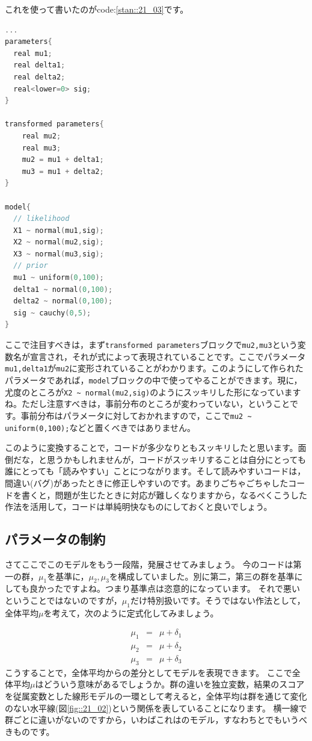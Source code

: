 \documentclass{ltjsbook}
\begin{document}
これを使って書いたのがcode:\ref{stan::21_03}です。
\begin{lstlisting}[language=C++,label={stan::21_03},caption={パラメータ変換を入れたコード}]
...
parameters{
  real mu1;
  real delta1;
  real delta2;
  real<lower=0> sig;
}

transformed parameters{
    real mu2;
    real mu3;
    mu2 = mu1 + delta1;
    mu3 = mu1 + delta2;
}

model{
  // likelihood
  X1 ~ normal(mu1,sig);
  X2 ~ normal(mu2,sig);
  X3 ~ normal(mu3,sig);
  // prior
  mu1 ~ uniform(0,100);
  delta1 ~ normal(0,100);
  delta2 ~ normal(0,100);
  sig ~ cauchy(0,5);
}

\end{lstlisting}
ここで注目すべきは，まず\verb|transformed parameters|ブロックで\verb|mu2,mu3|という変数名が宣言され，それが式によって表現されていることです。ここでパラメータ\verb|mu1,delta1|が\verb|mu2|に変形されていることがわかります。このようにして作られたパラメータであれば，\verb|model|ブロックの中で使ってやることができます。現に，尤度のところが\verb|X2 ~ normal(mu2,sig)|のようにスッキリした形になっていますね。ただし注意すべきは，事前分布のところが変わっていない，ということです。事前分布はパラメータに対しておかれますので，ここで\verb|mu2 ~ uniform(0,100);|などと置くべきではありません。

このように変換することで，コードが多少なりともスッキリしたと思います。面倒だな，と思うかもしれませんが，コードがスッキリすることは自分にとっても誰にとっても「読みやすい」ことにつながります。そして読みやすいコードは，間違い(バグ)があったときに修正しやすいのです。あまりごちゃごちゃしたコードを書くと，問題が生じたときに対応が難しくなりますから，なるべくこうした作法を活用して，コードは単純明快なものにしておくと良いでしょう。
\subsection{パラメータの制約}
さてここでこのモデルをもう一段階，発展させてみましょう。
今のコードは第一の群，$\mu_1$を基準に，$\mu_2,\mu_3$を構成していました。別に第二，第三の群を基準にしても良かったですよね。つまり基準点は恣意的になっています。
それで悪いということではないのですが，$\mu_1$だけ特別扱いです。そうではない作法として，全体平均$\mu$を考えて，次のように定式化してみましょう。

\begin{eqnarray}
  \mu_1 &=& \mu + \delta_1 \\
  \mu_2 &=& \mu + \delta_2 \\
  \mu_3 &=& \mu + \delta_3
\end{eqnarray}
こうすることで，全体平均からの差分としてモデルを表現できます。
ここで全体平均$\mu$はどういう意味があるでしょうか。群の違いを独立変数，結果のスコアを従属変数とした線形モデルの一環として考えると，全体平均は群を通じて変化のない水平線(図\ref{fig::21_02})という関係を表していることになります。
横一線で群ごとに違いがないのですから，いわばこれはのモデル，すなわちとでもいうべきものです。
\end{document}
